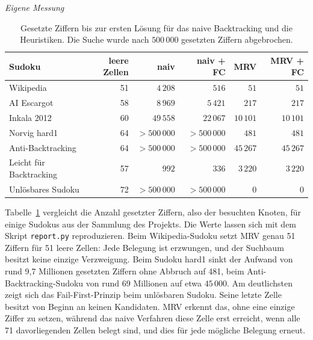 \begin{table}[hbt]
	\centering
	\caption[Gesetzte Ziffern bis zur ersten Lösung: naives Backtracking und Heuristiken]{Gesetzte Ziffern bis zur ersten Lösung für das naive Backtracking und die Heuristiken.
	Die Suche wurde nach $500\,000$ gesetzten Ziffern abgebrochen.} {\emph{Eigene Messung}}
	\label{tab:bt-heuristiken}
	\begin{tabular}{lrrrrr}
		\toprule
		Sudoku & leere Zellen & naiv & naiv + \acs{FC} & \acs{MRV} & \acs{MRV} + \acs{FC} \\
		\midrule
		Wikipedia                      & 51 & $4\,208$     & $516$        & $51$       & $51$ \\
		AI Escargot                    & 58 & $8\,969$     & $5\,421$     & $217$      & $217$ \\
		Inkala 2012                    & 60 & $49\,558$    & $22\,067$    & $10\,101$  & $10\,101$ \\
		Norvig \glqq hard1\grqq{}      & 64 & $>500\,000$  & $>500\,000$  & $481$      & $481$ \\
		Anti-Backtracking              & 64 & $>500\,000$  & $>500\,000$  & $45\,267$  & $45\,267$ \\
		Leicht für Backtracking	       & 57 & $992$        & $336$        & $3\,220$   & $3\,220$ \\
		Unlösbares Sudoku              & 72 & $>500\,000$  & $>500\,000$  & $0$        & $0$ \\
		\bottomrule
	\end{tabular}
\end{table}

Tabelle~\ref{tab:bt-heuristiken} vergleicht die Anzahl gesetzter Ziffern, also der besuchten Knoten, 
für einige Sudokus aus der Sammlung des Projekts. 
Die Werte lassen sich mit dem Skript \texttt{report.py} reproduzieren. 
Beim Wikipedia-Sudoku setzt \ac{MRV} genau 51 Ziffern für 51 leere Zellen: 
Jede Belegung ist erzwungen, und der Suchbaum besitzt keine einzige Verzweigung. 
Beim Sudoku \glqq hard1\grqq{} sinkt der Aufwand von rund 9,7 Millionen gesetzten Ziffern 
ohne Abbruch auf 481, beim Anti-Backtracking-Sudoku von rund 69 Millionen auf etwa $45\,000$. 
Am deutlichsten zeigt sich das Fail-First-Prinzip beim unlösbaren Sudoku. 
Seine letzte Zelle besitzt von Beginn an keinen Kandidaten. 
\ac{MRV} erkennt das, ohne eine einzige Ziffer zu setzen, 
während das naive Verfahren diese Zelle erst erreicht, wenn alle 71 davorliegenden Zellen belegt sind, und dies für jede mögliche Belegung erneut.

